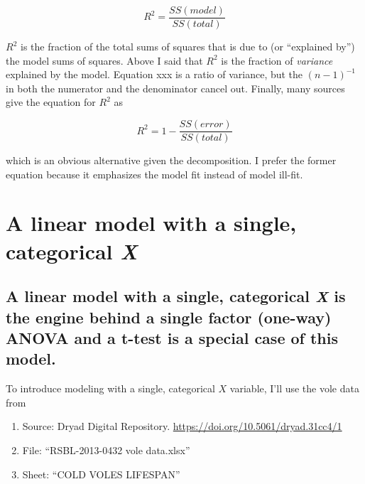 \documentclass[]{book}
\providecommand{\tightlist}{%
  \setlength{\itemsep}{0pt}\setlength{\parskip}{0pt}}
\begin{document}
\begin{equation}
R^2 = \frac{SS(model)}{SS(total)}
\end{equation}

\(R^2\) is the fraction of the total sums of squares that is due to (or
``explained by'') the model sums of squares. Above I said that \(R^2\)
is the fraction of \emph{variance} explained by the model. Equation xxx
is a ratio of variance, but the \((n-1)^{-1}\) in both the numerator and
the denominator cancel out. Finally, many sources give the equation for
\(R^2\) as

\begin{equation}
R^2 = 1- \frac{SS(error)}{SS(total)}
\end{equation}

which is an obvious alternative given the decomposition. I prefer the
former equation because it emphasizes the model fit instead of model
ill-fit.

\chapter{\texorpdfstring{A linear model with a single, categorical
\emph{X}}{A linear model with a single, categorical X}}\label{a-linear-model-with-a-single-categorical-x}

\section{\texorpdfstring{A linear model with a single, categorical
\emph{X} is the engine behind a single factor (one-way) ANOVA and a
t-test is a special case of this
model.}{A linear model with a single, categorical X is the engine behind a single factor (one-way) ANOVA and a t-test is a special case of this model.}}\label{a-linear-model-with-a-single-categorical-x-is-the-engine-behind-a-single-factor-one-way-anova-and-a-t-test-is-a-special-case-of-this-model.}

To introduce modeling with a single, categorical \(X\) variable, I'll
use the vole data from

\begin{enumerate}
\def\labelenumi{\arabic{enumi}.}
\tightlist
\item
  Source: Dryad Digital Repository.
  \url{https://doi.org/10.5061/dryad.31cc4/1}
\item
  File: ``RSBL-2013-0432 vole data.xlsx''
\item
  Sheet: ``COLD VOLES LIFESPAN''
\end{enumerate}
\end{document}
